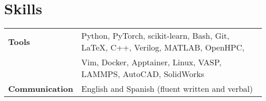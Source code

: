 \section{Skills}

\begin{tabular}{p{8em} p{40em}}
\textbf{Tools}         & Python, PyTorch, scikit-learn, Bash, Git, \LaTeX, C++, Verilog, MATLAB, OpenHPC, \\
                       & Vim, Docker, Apptainer, Linux, VASP, LAMMPS, AutoCAD, SolidWorks \\
\textbf{Communication} & English and Spanish (fluent written and verbal)
\end{tabular}
